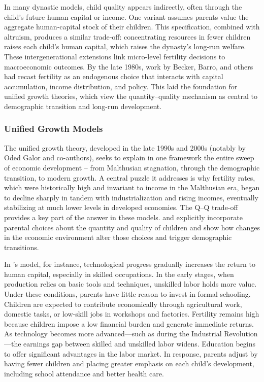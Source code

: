 \documentclass[]{AEA}
\begin{document}
In many dynastic models, child quality appears indirectly, often through
the child's future human capital or income. One variant assumes parents
value the aggregate human‐capital stock of their children. This
specification, combined with altruism, produces a similar trade‐off:
concentrating resources in fewer children raises each child's human
capital, which raises the dynasty's long‐run welfare. These
intergenerational extensions link micro‐level fertility decisions to
macroeconomic outcomes. By the late 1980s, work by Becker, Barro, and
others had recast fertility as an endogenous choice that interacts with
capital accumulation, income distribution, and policy. This laid the
foundation for unified growth theories, which view the quantity--quality
mechanism as central to demographic transition and long-run development.

\subsubsection{Unified Growth Models}

The unified growth theory, developed in the late 1990s and 2000s
(notably by Oded Galor and co-authors), seeks to explain in one
framework the entire sweep of economic development -- from Malthusian
stagnation, through the demographic transition, to modern growth. A
central puzzle it addresses is why fertility rates, which were
historically high and invariant to income in the Malthusian era, began
to decline sharply in tandem with industrialization and rising incomes,
eventually stabilizing at much lower levels in developed economies. The
Q--Q trade-off provides a key part of the answer in these models.
\citet{galor2000population} and \citet{galor2002natural} explicitly
incorporate parental choices about the quantity and quality of children
and show how changes in the economic environment alter those choices and
trigger demographic transitions.

In \citet{galor2000population}'s model, for instance, technological
progress gradually increases the return to human capital, especially in
skilled occupations. In the early stages, when production relies on
basic tools and techniques, unskilled labor holds more value. Under
these conditions, parents have little reason to invest in formal
schooling. Children are expected to contribute economically through
agricultural work, domestic tasks, or low-skill jobs in workshops and
factories. Fertility remains high because children impose a low
financial burden and generate immediate returns. As technology becomes
more advanced---such as during the Industrial Revolution---the earnings
gap between skilled and unskilled labor widens. Education begins to
offer significant advantages in the labor market. In response, parents
adjust by having fewer children and placing greater emphasis on each
child's development, including school attendance and better health care.
\end{document}
